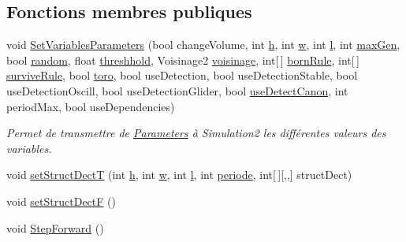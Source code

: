 \subsection*{Fonctions membres publiques}
\begin{DoxyCompactItemize}
\item 
void \mbox{\hyperlink{class_simulation_af1580cd4ce5cb935c5f55ad4ce4f94de}{Set\+Variables\+Parameters}} (bool change\+Volume, int \mbox{\hyperlink{class_simulation_a66b52a85390c56f61bdd9f8dcf112608}{h}}, int \mbox{\hyperlink{class_simulation_ae5fbb318a6156864c54a36380ff54a23}{w}}, int \mbox{\hyperlink{class_simulation_ae57d3ef4739c9bfee92f26318c848b61}{l}}, int \mbox{\hyperlink{class_simulation_ace7b43c186833b6babd2f131eb705ebb}{max\+Gen}}, bool \mbox{\hyperlink{class_simulation_aedb9a065e068f5a643f6cb40b82942da}{random}}, float \mbox{\hyperlink{class_simulation_a6ea09f230373dac17ac214fd287b697f}{threshhold}}, Voisinage2 \mbox{\hyperlink{class_simulation_abace05fc32d6e12236e7e272a901df49}{voisinage}}, int\mbox{[}$\,$\mbox{]} \mbox{\hyperlink{class_simulation_a6669b07eee108268664786cefe871ecc}{born\+Rule}}, int\mbox{[}$\,$\mbox{]} \mbox{\hyperlink{class_simulation_afd9ae047431cdaa8de58cd9a442dcf18}{survive\+Rule}}, bool \mbox{\hyperlink{class_simulation_a0d34073239ee6afd6c15327ae9f249bb}{toro}}, bool use\+Detection, bool use\+Detection\+Stable, bool use\+Detection\+Oscill, bool use\+Detection\+Glider, bool \mbox{\hyperlink{class_simulation_a2106f84d6bf1aec6e3d852e4a4432217}{use\+Detect\+Canon}}, int period\+Max, bool use\+Dependencies)
\begin{DoxyCompactList}\small\item\em Permet de transmettre de \mbox{\hyperlink{class_parameters}{Parameters}} à Simulation2 les différentes valeurs des variables. \end{DoxyCompactList}\item 
void \mbox{\hyperlink{class_simulation_a19b96b4354d41349e367d282cc4e88aa}{set\+Struct\+DectT}} (int \mbox{\hyperlink{class_simulation_a66b52a85390c56f61bdd9f8dcf112608}{h}}, int \mbox{\hyperlink{class_simulation_ae5fbb318a6156864c54a36380ff54a23}{w}}, int \mbox{\hyperlink{class_simulation_ae57d3ef4739c9bfee92f26318c848b61}{l}}, int \mbox{\hyperlink{class_simulation_aee455a3c4114262af0c5242aa26ea779}{periode}}, int\mbox{[}$\,$\mbox{]}\mbox{[},,\mbox{]} struct\+Dect)
\item 
void \mbox{\hyperlink{class_simulation_a93ab4fa0107498061196ce3a051d292d}{set\+Struct\+DectF}} ()
\item 
void \mbox{\hyperlink{class_simulation_a1ba6581d305c2d60d174e0cffd917719}{Step\+Forward}} ()

\end{DoxyCompactItemize}
